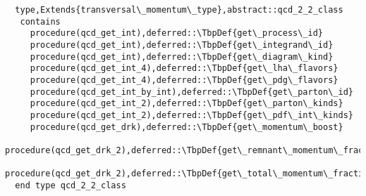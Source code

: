 \begin{Verbatim}
  type,Extends{transversal\_momentum\_type},abstract::qcd_2_2_class
   contains
     procedure(qcd_get_int),deferred::\TbpDef{get\_process\_id}
     procedure(qcd_get_int),deferred::\TbpDef{get\_integrand\_id}
     procedure(qcd_get_int),deferred::\TbpDef{get\_diagram\_kind}
     procedure(qcd_get_int_4),deferred::\TbpDef{get\_lha\_flavors}
     procedure(qcd_get_int_4),deferred::\TbpDef{get\_pdg\_flavors}
     procedure(qcd_get_int_by_int),deferred::\TbpDef{get\_parton\_id}
     procedure(qcd_get_int_2),deferred::\TbpDef{get\_parton\_kinds}
     procedure(qcd_get_int_2),deferred::\TbpDef{get\_pdf\_int\_kinds}
     procedure(qcd_get_drk),deferred::\TbpDef{get\_momentum\_boost}
     procedure(qcd_get_drk_2),deferred::\TbpDef{get\_remnant\_momentum\_fractions}
     procedure(qcd_get_drk_2),deferred::\TbpDef{get\_total\_momentum\_fractions}
  end type qcd_2_2_class
\end{Verbatim}
